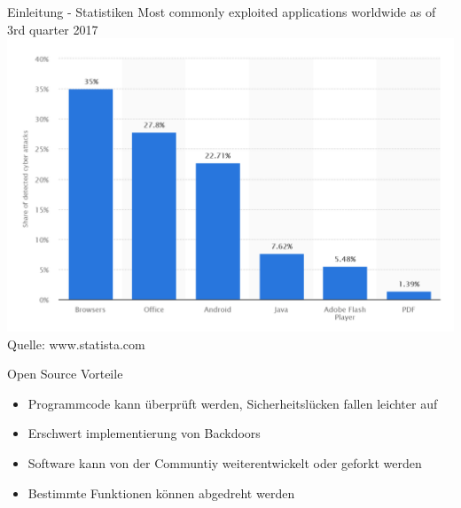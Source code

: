 \documentclass[10pt]{beamer}
\begin{document}
\begin{frame}[fragile]{Einleitung - Statistiken}
  Most commonly exploited applications worldwide as of 3rd quarter 2017
  \newline
  \includegraphics[scale=0.5]{cyberattacks_2017}
  \newline
  Quelle: www.statista.com
\end{frame}


\begin{frame}[fragile]{Open Source Vorteile}
  \begin{itemize}
    \item Programmcode kann \"uberpr\"uft werden, Sicherheitsl\"ucken fallen leichter auf
    \item Erschwert implementierung von Backdoors
    \item Software kann von der Communtiy weiterentwickelt oder geforkt werden
    \item Bestimmte Funktionen k\"onnen abgedreht werden
  \end{itemize}
\end{frame}

\end{document}

